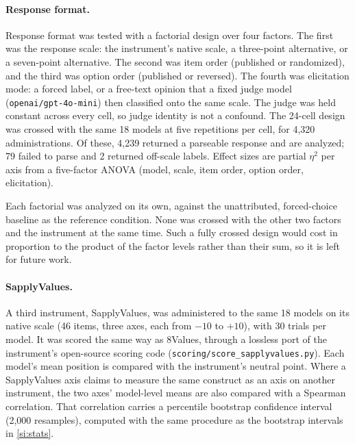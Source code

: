 \documentclass[12pt]{article}
\begin{document}
\paragraph{Response format.} Response format was tested with a factorial design over four factors. The first was the
response scale: the instrument's native scale, a three-point alternative, or a seven-point alternative. The
second was item order (published or randomized), and the third was option order (published or
reversed). The fourth was elicitation mode: a forced label, or a free-text opinion that a fixed judge model
(\texttt{openai/gpt-4o-mini}) then classified onto the same scale. The judge was held constant across every cell,
so judge identity is not a confound. The 24-cell design was crossed with the same 18 models at five
repetitions per cell, for 4{,}320 administrations. Of these, 4{,}239 returned a parseable response and are
analyzed; 79 failed to parse and 2 returned off-scale labels. Effect sizes are partial $\eta^2$ per axis from a
five-factor ANOVA (model, scale, item order, option order, elicitation).

Each factorial was analyzed on its own, against the unattributed, forced-choice baseline as the reference
condition. None was crossed with the other two factors and the instrument at the same time. Such a
fully crossed design would cost in proportion to the product of the factor levels rather than their sum, so
it is left for future work.

\paragraph{SapplyValues.} A third instrument, SapplyValues, was administered to the same 18 models on its native
scale (46 items, three axes, each from $-10$ to $+10$), with 30 trials per model. It was scored the same way
as 8Values, through a lossless port of the instrument's open-source scoring code
(\texttt{scoring/score\_sapplyvalues.py}). Each model's mean position is compared with the instrument's neutral
point. Where a SapplyValues axis claims to measure the same construct as an axis on another
instrument, the two axes' model-level means are also compared with a Spearman correlation. That
correlation carries a percentile bootstrap confidence interval (2{,}000 resamples), computed with the
same procedure as the bootstrap intervals in \ref{si:stats}.
\end{document}
